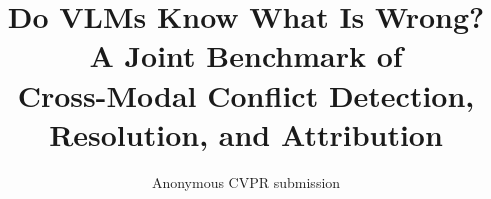 \documentclass[10pt,twocolumn,letterpaper]{article}
\title{Do VLMs Know What Is Wrong? A Joint Benchmark of\\Cross-Modal Conflict Detection, Resolution, and Attribution}
\author{Anonymous CVPR submission}
\begin{document}
\maketitle









{
    \small
    
    
}
\end{document}
